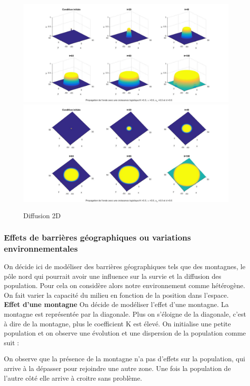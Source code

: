 \documentclass[a4paper,11pt]{article}
\begin{document}
\begin{figure}[H]
	\centering
	\includegraphics[width=1\linewidth]{SimulationKPP/KPP13}\hfill
    \includegraphics[width=1\linewidth]{SimulationKPP/KPP15}
    \caption{Diffusion 2D}
\end{figure}


\subsubsection{Effets de barrières géographiques ou variations environnementales}
On décide ici de modéliser des barrières géographiques tels que des montagnes, le pôle nord qui pourrait avoir une influence sur la survie et la diffusion des population.
Pour cela on considère alors notre environnement comme hétérogène. On fait varier la capacité du milieu en fonction de la position dans l'espace.\\
\textbf{Effet d'une montagne}
On décide de modéliser l'effet d'une montagne. La montagne est représentée par la diagonale. Plus on s'éloigne de la diagonale, c'est à dire de la montagne, plus le coefficient K est élevé. On initialise une petite population et on observe une évolution et une dispersion de la population comme suit : 

On observe que la présence de la montagne n'a pas d'effets sur la population, qui arrive à la dépasser pour rejoindre une autre zone. Une fois la population de l'autre côté elle arrive à croitre sans problème.
\end{document}
